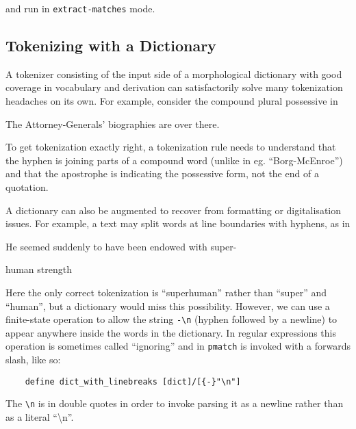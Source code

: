 \documentclass{llncs}
\begin{document}
and run in \verb+extract-matches+ mode.

\subsection{Tokenizing with a Dictionary}

A tokenizer consisting of the input side of a morphological dictionary
with good coverage in vocabulary and derivation can satisfactorily solve
many tokenization headaches on its own. For example, consider the compound
plural possessive in

\begin{exe}
  \item The Attorney-Generals' biographies are over there.
\end{exe}

To get tokenization exactly right, a tokenization rule needs to understand that
the hyphen is joining parts of a compound word (unlike in eg.
``Borg-McEnroe'') and that the apostrophe is indicating the possessive form,
not the end of a quotation.

A dictionary can also be augmented to recover from
formatting or digitalisation issues. For example, a text may split words
at line boundaries with hyphens, as in

\begin{exe}
\item He seemed suddenly to have been endowed with super-

  human strength
\end{exe}

Here the only correct tokenization is ``superhuman'' rather than ``super''
and ``human'', but a dictionary would miss this possibility. However,
we can use a finite-state operation to allow the string \verb+-\n+ (hyphen
followed by a newline) to appear anywhere inside the words in the dictionary.
In regular expressions this operation is sometimes called ``ignoring'' and in
\verb+pmatch+ is invoked with a forwards slash, like so:

\begin{center}
  \begin{framed}
\begin{verbatim}
    define dict_with_linebreaks [dict]/[{-}"\n"]
\end{verbatim}
  \end{framed}
\end{center}

The \verb+\n+ is in double quotes in order to invoke parsing it as a newline
rather than as a literal ``\textbackslash n''.
\end{document}
